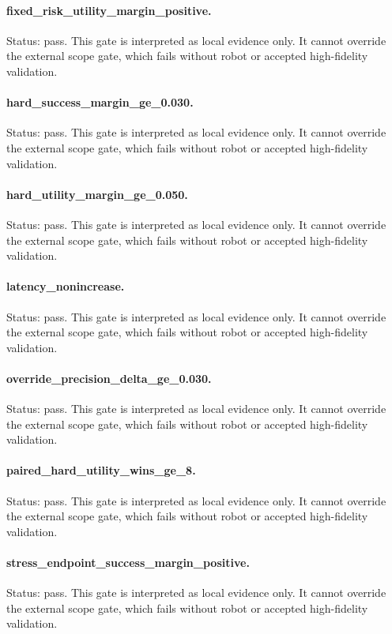 \documentclass{article}
\begin{document}
\paragraph{fixed\_risk\_utility\_margin\_positive.} Status: pass. This gate is interpreted as local evidence only. It cannot override the external scope gate, which fails without robot or accepted high-fidelity validation.
\paragraph{hard\_success\_margin\_ge\_0.030.} Status: pass. This gate is interpreted as local evidence only. It cannot override the external scope gate, which fails without robot or accepted high-fidelity validation.
\paragraph{hard\_utility\_margin\_ge\_0.050.} Status: pass. This gate is interpreted as local evidence only. It cannot override the external scope gate, which fails without robot or accepted high-fidelity validation.
\paragraph{latency\_nonincrease.} Status: pass. This gate is interpreted as local evidence only. It cannot override the external scope gate, which fails without robot or accepted high-fidelity validation.
\paragraph{override\_precision\_delta\_ge\_0.030.} Status: pass. This gate is interpreted as local evidence only. It cannot override the external scope gate, which fails without robot or accepted high-fidelity validation.
\paragraph{paired\_hard\_utility\_wins\_ge\_8.} Status: pass. This gate is interpreted as local evidence only. It cannot override the external scope gate, which fails without robot or accepted high-fidelity validation.
\paragraph{stress\_endpoint\_success\_margin\_positive.} Status: pass. This gate is interpreted as local evidence only. It cannot override the external scope gate, which fails without robot or accepted high-fidelity validation.
\end{document}

